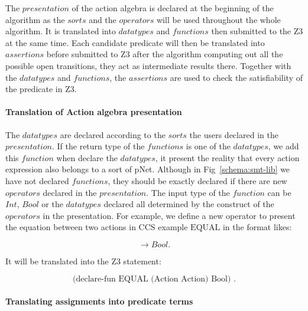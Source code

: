 \documentclass{lncs/llncs}
\begin{document}
The $presentation$ of the action algebra
is declared at the beginning of the algorithm as the $sorts$ and the
$operators$ will be used throughout the whole algorithm. It is
translated into $datatypes$ and $functions$ then submitted to the Z3
at the same time. Each candidate predicate will then be translated into $assertions$ before submitted to Z3 after the algorithm computing out all the possible open transitions, they act as intermediate results there. Together with the $datatypes$ and $functions$, the $assertions$ are used to check the satisfiability of the predicate in Z3.


\paragraph{Translation of Action algebra presentation}

The $datatypes$ are declared according to the $sorts$ the users declared in the $presentation$. If the return type of the $functions$ is one of the $datatypes$, we add this $function$ when declare the $datatypes$, it present the reality that every action expression also belongs to a sort of pNet. Although in Fig~\ref{schema:smt-lib} we have not declared $functions$, they should be exactly declared if there are new $operators$ declared in the $presentation$. The input type of the $function$ can be $Int$, $Bool$ or the $datatypes$ declared all determined by the construct of the  $operators$ in the presentation. For example, we define a new operator to present the equation between two actions in CCS example $\text{EQUAL}$ in the format likes:

\[< Action , Action > \rightarrow Bool .\]

It will be translated into the Z3 statement: 

\[\text{(declare-fun\ EQUAL\ (Action\ Action)\ Bool) .}\]

\paragraph{Translating assignments into predicate terms}
\end{document}
